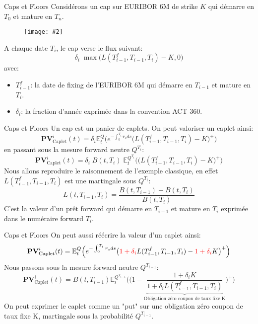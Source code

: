 \documentclass{beamer}
\newcommand{\FIG}[2]{\texttt{[image: \#2]}}
\begin{document}
\begin{frame}{Caps et Floors}
Considérons un cap sur EURIBOR 6M de strike $K$ qui démarre en $T_0$ et mature en $T_n$.
\begin{figure}[h]
\FIG{10cm}{figures/schema_cap.jpg}
\end{figure}
A chaque date $T_i$, le cap verse le flux suivant:
\[
\delta_i\; \max \big(L(T_{i -1}^f,T_{i -1},T_i) - K, 0\big)
\]
avec:
\begin {itemize}
\item $T_{i -1}^f$: la date de fixing de l'EURIBOR 6M qui démarre en $T_{i -1}$ et mature en $T_{i}$.
\item $\delta_i$: la fraction d'année exprimée dans la convention ACT 360.
\end {itemize}
\end{frame}

\begin{frame}{Caps et Floors}
Un cap est un panier de caplets. On peut valoriser un caplet ainsi:
\[
\textbf{PV}_\text{Caplet}^i(t)=\delta_i \mathbb{E}_t^{Q}\Big(e^{-\int_0^{T_i} r_s ds}\big(L(T_ {i-1}^f,T_{i-1},T_i)-K\big)^+\Big)
\]
en passant sous la mesure forward neutre $Q^{T_i}$:
\[
\textbf{PV}_\text{Caplet}^i(t)=\delta_i \;B(t,T_i)\;\mathbb{E}_t^{Q^{T_i}}\Big(\big(L(T_ {i-1}^f,T_{i-1},T_i)-K\big)^+\Big)
\]
Nous allons reproduire le raisonnement de l'exemple classique, en effet $L(T_ {i-1}^f,T_{i-1},T_i)$ est une martingale sous $Q^{T_i}$:
\[
L(t,T_{i-1},T_i)= \frac{B(t,T_{i-1})-B(t,T_i)}{B(t,T_i)}
\]
C'est la valeur d'un prêt forward qui démarre en $T_{i-1}$ et mature en $T_i$ exprimée dans le numéraire forward $T_i$.
\end{frame}

\begin{frame}{Caps et Floors}
On peut aussi réécrire la valeur d'un caplet ainsi:
\[
\textbf{PV}_\text{Caplet}^i(t)= \mathbb{E}_t^{Q}\Big(e^{-\int_0^{T_i} r_s ds}\big(\color{red}1+\delta_i\color{black}L(T_ {i-1}^f,T_{i-1},T_i)-\color{red}1+\delta_i\color{black}K\big)^+\Big)
\]
Nous passons sous la mesure forward neutre $Q^{T_{i-1}}$:\\
\[
\textbf{PV}_\text{Caplet}^i(t)= B(t,T_{i-1})\mathbb{E}_t^{Q^{T_{i-1}}}\Big(\big(1-\underbrace{\frac{1+\delta_iK}{1+\delta_iL(T_ {i-1}^f,T_{i-1},T_i)}}_{\text{Obligation zéro coupon de taux fixe K}}\big)^+\Big)
\]
On peut exprimer le caplet comme un "put" sur une obligation zéro coupon de taux fixe K, martingale sous la probabilité $Q^{T_{i-1}}$.
\end{frame}
\end{document}
